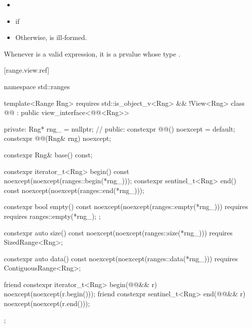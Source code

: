 {\begin{itemize}
\item {}

\item {}  if  

\item Otherwise,  is ill-formed.
\end{itemize}

\begin{note}
Whenever  is a valid expression, it is a prvalue
whose type   .
\end{note}

{\color{newclr}
[range.view.ref]{}

\begin{codeblock}
namespace std::ranges {
  template<Range Rng>
    requires std::is_object_v<Rng> && !View<Rng>
  class @@ : public view_interface<@@<Rng>> {
  private:
    Rng* rng_ = nullptr; // \expos
  public:
    constexpr @@() noexcept = default;
    constexpr @@(Rng& rng) noexcept;

    constexpr Rng& base() const;

    constexpr iterator_t<Rng> begin() const
      noexcept(noexcept(ranges::begin(*rng_)));
    constexpr sentinel_t<Rng> end() const
      noexcept(noexcept(ranges::end(*rng_)));

    constexpr bool empty() const
      noexcept(noexcept(ranges::empty(*rng_)))
      requires requires { ranges::empty(*rng_); };

    constexpr auto size() const
      noexcept(noexcept(ranges::size(*rng_)))
      requires SizedRange<Rng>;

    constexpr auto data() const
      noexcept(noexcept(ranges::data(*rng_)))
      requires ContiguousRange<Rng>;

    friend constexpr iterator_t<Rng> begin(@@&& r)
      noexcept(noexcept(r.begin()));
    friend constexpr sentinel_t<Rng> end(@@&& r)
      noexcept(noexcept(r.end()));
  };
}
\end{codeblock}

}}
